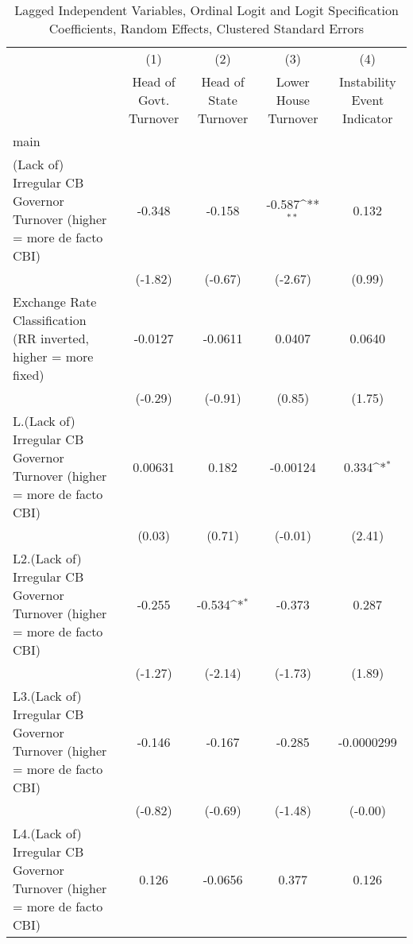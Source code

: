 {
\def\sym#1{\ifmmode^{#1}\else\(^{#1}\)\fi}
\begin{longtable}{l*{4}{c}}
\caption{Lagged Independent Variables, Ordinal Logit and Logit Specification Coefficients, Random Effects, Clustered Standard Errors \label{lagordLogLogDF}}\\
\hline\hline\endfirsthead\hline\endhead\hline\endfoot\endlastfoot
                &\multicolumn{1}{c}{(1)}&\multicolumn{1}{c}{(2)}&\multicolumn{1}{c}{(3)}&\multicolumn{1}{c}{(4)}\\
                &\multicolumn{1}{c}{Head of Govt. Turnover}&\multicolumn{1}{c}{Head of State Turnover}&\multicolumn{1}{c}{Lower House Turnover}&\multicolumn{1}{c}{Instability Event Indicator}\\
\hline
main            &                  &                  &                  &                  \\
(Lack of) Irregular CB Governor Turnover (higher = more de facto CBI)&   -0.348         &   -0.158         &   -0.587\sym{**} &    0.132         \\
                &  (-1.82)         &  (-0.67)         &  (-2.67)         &   (0.99)         \\
[1em]
Exchange Rate Classification (RR inverted, higher = more fixed)&  -0.0127         &  -0.0611         &   0.0407         &   0.0640         \\
                &  (-0.29)         &  (-0.91)         &   (0.85)         &   (1.75)         \\
[1em]
L.(Lack of) Irregular CB Governor Turnover (higher = more de facto CBI)&  0.00631         &    0.182         & -0.00124         &    0.334\sym{*}  \\
                &   (0.03)         &   (0.71)         &  (-0.01)         &   (2.41)         \\
[1em]
L2.(Lack of) Irregular CB Governor Turnover (higher = more de facto CBI)&   -0.255         &   -0.534\sym{*}  &   -0.373         &    0.287         \\
                &  (-1.27)         &  (-2.14)         &  (-1.73)         &   (1.89)         \\
[1em]
L3.(Lack of) Irregular CB Governor Turnover (higher = more de facto CBI)&   -0.146         &   -0.167         &   -0.285         &-0.0000299         \\
                &  (-0.82)         &  (-0.69)         &  (-1.48)         &  (-0.00)         \\
[1em]
L4.(Lack of) Irregular CB Governor Turnover (higher = more de facto CBI)&    0.126         &  -0.0656         &    0.377         &    0.126         \\

\end{longtable}}
